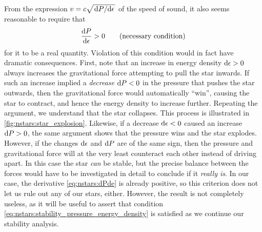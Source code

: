 From the expression $v = c \sqrt{\odv{P}/{\epsilon}}$ of the speed of sound, it also seems reasonable to require that
\begin{equation}
	\odv{P}{\epsilon} > 0
	\qquad \text{(necessary condition)}
\label{eq:nstars:stability_pressure_energy_density}
\end{equation}
for it to be a real quantity.
Violation of this condition would in fact have dramatic consequences.
First, note that an increase in energy density $\mathop{}\!\mathrm{d} \epsilon > 0$ always increases the gravitational force attempting to pull the star inwards.
If such an increase implied a \emph{decrease} $\mathop{}\!\mathrm{d} P < 0$ in the pressure that pushes the star outwards, then the gravitational force would automatically ``win'', causing the star to contract, and hence the energy density to increase further.
Repeating the argument, we understand that the star collapses.
This process is illustrated in \cref{fig:nstars:star_explosion}.
Likewise, if a decrease $\mathop{}\!\mathrm{d} \epsilon < 0$ caused an increase $\mathop{}\!\mathrm{d} P > 0$, the same argument shows that the pressure wins and the star explodes.
However, if the changes $\mathop{}\!\mathrm{d} \epsilon$ and $\mathop{}\!\mathrm{d} P$ are of the same sign, then the pressure and gravitational force will at the very least counteract each other instead of driving apart.
In this case the star \emph{can} be stable, but the precise balance between the forces would have to be investigated in detail to conclude if it \emph{really is}.
In our case, the derivative \eqref{eq:nstars:dPde} is already positive, so this criterion does not let us rule out any of our stars, either.
However, the result is not completely useless, as it will be useful to assert that condition \eqref{eq:nstars:stability_pressure_energy_density} is satisfied as we continue our stability analysis.

